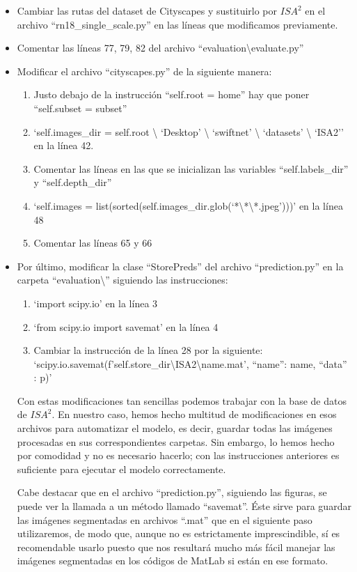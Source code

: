 \begin{itemize}
\item Cambiar las rutas del dataset de Cityscapes y sustituirlo por $ISA^{2}$ en el archivo ``rn18\_single\_scale.py'' en las líneas que modificamos previamente.
\item Comentar las líneas 77, 79, 82 del archivo ``evaluation\textbackslash{evaluate.py}''
\item Modificar el archivo ``cityscapes.py'' de la siguiente manera:

\begin{enumerate}
\item Justo debajo de la instrucción ``self.root = home'' hay que poner ``self.subset = subset''
\item `self.images\_dir = self.root \textbackslash{} `Desktop' \textbackslash{} `swiftnet' \textbackslash{} `datasets' \textbackslash{} `ISA2'' en la línea 42.
\item Comentar las líneas en las que se inicializan las variables ``self.labels\_dir'' y ``self.depth\_dir''
\item `self.images = list(sorted(self.images\_dir.glob(`*\textbackslash{*}\textbackslash{*.jpeg}')))' en la línea 48
\item Comentar las líneas 65 y 66
\end{enumerate}

\item Por último, modificar la clase ``StorePreds'' del archivo ``prediction.py'' en la carpeta ``evaluation\textbackslash{}'' siguiendo las instrucciones:

\begin{enumerate}
\item `import scipy.io' en la línea 3
\item `from scipy.io import savemat' en la línea 4
\item Cambiar la instrucción de la línea 28 por la siguiente: `scipy.io.savemat(f'{self.store\_dir}\textbackslash{ISA2}\textbackslash{{name}.mat}', {``name'': name, ``data'' : p})'
\end{enumerate}

Con estas modificaciones tan sencillas podemos trabajar con la base de datos de $ISA^{2}$. En nuestro caso, hemos hecho multitud de modificaciones en esos archivos para automatizar el modelo, es decir, guardar todas las imágenes procesadas en sus correspondientes carpetas. Sin embargo, lo hemos hecho por comodidad y no es necesario hacerlo; con las instrucciones anteriores es suficiente para ejecutar el modelo correctamente.

Cabe destacar que en el archivo ``prediction.py'', siguiendo las figuras, se puede ver la llamada a un método llamado ``savemat''. Éste sirve para guardar las imágenes segmentadas en archivos ``.mat'' que en el siguiente paso utilizaremos, de modo que, aunque no es estrictamente imprescindible, sí es recomendable usarlo puesto que nos resultará mucho más fácil manejar las imágenes segmentadas en los códigos de MatLab \cite{matlab} si están en ese formato.

\end{itemize}

